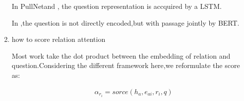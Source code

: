 \documentclass[sigconf]{acmart}
\begin{document}
\begin{enumerate}[(1)]
   		In PullNet\cite{sun2019pullnet}and \cite{xiong2019improving} ,	the question representation is accquired by a LSTM.
   		
   		In \cite{min2019knowledge} ,the question is not directly encoded,but with passage jointly by BERT.
   		
   		
   	
   	
   	\item how to score relation attention
   	
	   	Most work take the dot product between the embedding of relation and question.Considering the different framework here,we reformulate the score as:
	   	 
	   	 \begin{displaymath}
	   	 	\begin{aligned}
	   	 		&\alpha_{r_i} = sorce( h_{a},e_{ai},r_i,q)    	 		
	   	 	\end{aligned}
	   	 \end{displaymath}
	     	
   \end{enumerate} 


	
	
	
	
	
	
\end{document}
